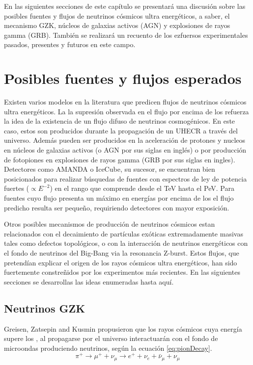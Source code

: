 En las siguientes secciones de este cap\'itulo se presentar\'a una discusi\'on sobre las posibles fuentes y flujos de neutrinos c\'osmicos ultra energ\'eticos, a saber, el mecanismo GZK, n\'ucleos de galaxias activos (AGN) y explosiones de rayos gamma (GRB).
Tambi\'en se realizar\'a un recuento de los ezfuersos experimentales pasados, presentes y futuros en este campo.

\section{Posibles fuentes y flujos esperados}

Existen varios modelos en la literatura que predicen flujos de neutrinos c\'osmicos ultra energ\'eticos.
La la supresi\'on observada en el flujo por encima de los  refuerza la idea de la existencia de un flujo difuso de neutrinos cosmog\'enicos.
En este caso, estos son producidos durante la propagaci\'on de un UHECR a trav\'es del universo. 
Adem\'as pueden ser producidos en la aceleraci\'on de protones y nucleos en n\'ucleos de galaxias activos (o AGN por sus siglas en ingl\'es)\cite{cite:nuAGN} o por producci\'on de fotopiones en explosiones de rayos gamma (GRB por sus siglas en ingles)\cite{cite:nuGRB}.
Detectores como AMANDA o IceCube, su sucesor, se encuentran bien posicionados para realizar b\'usquedas de fuentes con espectros de ley de potencia fuertes ($\propto E^{-2}$) en el rango que comprende desde el TeV  hasta el PeV. 
Para fuentes cuyo flujo presenta un m\'aximo en energ\'ias por encima de los  el flujo predicho resulta ser peque\~no, requiriendo detectores con mayor exposici\'on.

Otros posibles mecanismos de producci\'on de neutrinos c\'osmicos estan relacionados con el decaimiento de part\'iculas ex\'oticas extremadamente masivas tales como defectos topol\'ogicos\cite{cite:nuTopDefects}, o con la interacci\'on de neutrinos energ\'eticos con el fondo de neutrinos del Big-Bang via la resonancia Z-burst\cite{cite:nuZBurst_init}.
Estos flujos, que pretend\'ian explicar el origen de los rayos c\'osmicos ultra energ\'eticos, han sido fuertemente constre\~nidos por los experimentos m\'as recientes\cite{cite:nuConstraintsTD}.
En las siguientes secciones se desarrollas las ideas enumeradas hasta aqu\'i.

	\subsection{Neutrinos GZK}
	\label{sbsc:introGZK}
	Greisen, Zatsepin and Kusmin propusieron que los rayos c\'osmicos cuya energ\'ia supere los , al propagarse por el universo interactuar\'an con el fondo de microondas produciendo neutrinos, seg\'un la ecuaci\'on \ref{eq:pionDecay}.
	\begin{equation}\label{eq:pionDecay}
	\pi^{+} \rightarrow \mu^{+}+ \nu_{\mu} \rightarrow e^{+} + \nu_{e} + \bar{\nu}_{\mu} + \nu_{\mu}
	\end{equation}
	

